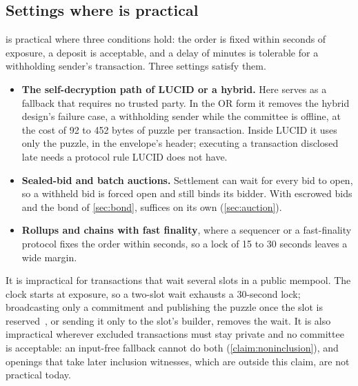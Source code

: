 \subsection{Settings where \leanseal is practical}\label{sec:realistic}

\leanseal is practical where three conditions hold: the order is fixed within seconds of exposure, a deposit is acceptable, and a delay of minutes is tolerable for a withholding sender's transaction. Three settings satisfy them.
\begin{itemize}[leftmargin=1.5em]
  \item \textbf{The self-decryption path of LUCID or a hybrid.} Here \leanseal serves as a fallback that requires no trusted party. In the OR form it removes the hybrid design's failure case, a withholding sender while the committee is offline, at the cost of 92 to 452 bytes of puzzle per transaction. Inside LUCID it uses only the puzzle, in the envelope's header; executing a transaction disclosed late needs a protocol rule LUCID does not have.
  \item \textbf{Sealed-bid and batch auctions.} Settlement can wait for every bid to open, so a withheld bid is forced open and still binds its bidder. With escrowed bids and the bond of \cref{sec:bond}, \leanseal suffices on its own (\cref{sec:auction}).
  \item \textbf{Rollups and chains with fast finality}, where a sequencer or a fast-finality protocol fixes the order within seconds, so a lock of 15 to 30 seconds leaves a wide margin.
\end{itemize}
It is impractical for transactions that wait several slots in a public mempool. The clock starts at exposure, so a two-slot wait exhausts a 30-second lock; broadcasting only a commitment and publishing the puzzle once the slot is reserved~\cite{Naraghi26}, or sending it only to the slot's builder, removes the wait. It is also impractical wherever excluded transactions must stay private and no committee is acceptable: an input-free fallback cannot do both (\cref{claim:noninclusion}), and openings that take later inclusion witnesses, which are outside this claim, are not practical today.
